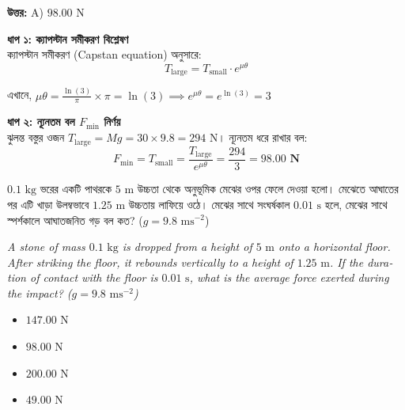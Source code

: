 \documentclass[12pt, a4paper]{article}
\begin{document}
{\begin{tcolorbox}[answerbox]
\textbf{\color{success} উত্তর:} A) $98.00\text{ N}$
\end{tcolorbox}
\vspace{1em}

\begin{tcolorbox}[solutionbox={সমাধান (Solution)}]
\noindent
\textbf{ধাপ ১: ক্যাপস্টান সমীকরণ বিশ্লেষণ} \\
ক্যাপস্টান সমীকরণ (Capstan equation) অনুসারে:
\[T_{\text{large}} = T_{\text{small}} \cdot e^{\mu \theta}\]

এখানে, $\mu \theta = \frac{\ln(3)}{\pi} \times \pi = \ln(3) \implies e^{\mu \theta} = e^{\ln(3)} = 3$

\vspace{0.5em}
\noindent\textbf{ধাপ ২: ন্যূনতম বল $F_{\text{min}}$ নির্ণয়} \\
ঝুলন্ত বস্তুর ওজন $T_{\text{large}} = Mg = 30 \times 9.8 = 294\text{ N}$।
ন্যূনতম ধরে রাখার বল:
\[F_{\text{min}} = T_{\text{small}} = \frac{T_{\text{large}}}{e^{\mu \theta}} = \frac{294}{3} = \mathbf{98.00\text{ N}}\]
\end{tcolorbox}

\vspace{2em}

\begin{tcolorbox}[questionbox={প্রশ্ন (Question) 41}]
\noindent
$0.1\text{ kg}$ ভরের একটি পাথরকে $5\text{ m}$ উচ্চতা থেকে অনুভূমিক মেঝের ওপর ফেলে দেওয়া হলো। মেঝেতে আঘাতের পর এটি খাড়া উলম্বভাবে $1.25\text{ m}$ উচ্চতায় লাফিয়ে ওঠে। মেঝের সাথে সংঘর্ষকাল $0.01\text{ s}$ হলে, মেঝের সাথে স্পর্শকালে আঘাতজনিত গড় বল কত? ($g = 9.8\text{ ms}^{-2}$)
\vspace{0.8em}
\begin{english}
\noindent\textit{\color{darkgray}
A stone of mass $0.1\text{ kg}$ is dropped from a height of $5\text{ m}$ onto a horizontal floor. After striking the floor, it rebounds vertically to a height of $1.25\text{ m}$. If the duration of contact with the floor is $0.01\text{ s}$, what is the average force exerted during the impact? ($g = 9.8\text{ ms}^{-2}$)
}
\end{english}
\end{tcolorbox}

\begin{itemize}[label={}, leftmargin=1cm, itemsep=0.5em]
\item[\textbf{A)}] $147.00\text{ N}$
\item[\textbf{B)}] $98.00\text{ N}$
\item[\textbf{C)}] $200.00\text{ N}$
\item[\textbf{D)}] $49.00\text{ N}$
\end{itemize}
\vspace{0.5em}

}
\end{document}
